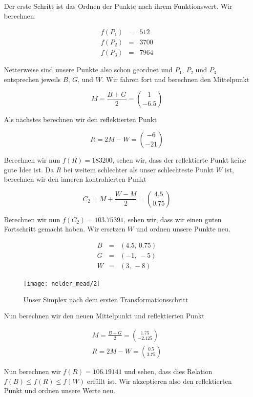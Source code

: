 \documentclass[naustrian]{article}
\begin{document}
{Der erste Schritt ist das Ordnen der Punkte nach ihrem Funktionswert. Wir berechnen:

\begin{eqnarray*}
    f(P_{1}) & = & 512\\
    f(P_{2}) & = & 3700\\
    f(P_{3}) & = & 7964
\end{eqnarray*}

Netterweise sind unsere Punkte also schon geordnet und $P_{1}$, $P_{2}$ und $P_{3}$ entsprechen jeweils
$B$, $G$, und $W$. Wir fahren fort und berechnen den Mittelpunkt

\[
    M = \frac{B + G}{2} = \binom{1}{-6.5}
\]

Als nächstes berechnen wir den reflektierten Punkt

\[
    R = 2M - W = \binom{-6}{-21}
\]

Berechnen wir nun $f(R) = 183200$, sehen wir, dass der reflektierte Punkt keine gute Idee ist. Da $R$
bei weitem schlechter als unser schlechteste Punkt $W$ ist, berechnen wir den inneren kontrahierten Punkt

\[
    C_{2} = M + \frac{W - M}{2} = \binom{4.5}{0.75}
\]

Berechnen wir nun $f(C_{2}) = 103.75391$, sehen wir, dass
wir einen guten Fortschritt gemacht haben. Wir ersetzen
$W$ und ordnen unsere Punkte neu.

\begin{eqnarray*}
    B & = & (4.5, \, 0.75)\\
    G & = & (-1,\,-5)\\
    W & = & (3,\,-8)
\end{eqnarray*}

\begin{figure}[H]
    \centering
    \texttt{[image: nelder\_mead/2]}
    \caption{Unser Simplex nach dem ersten Transformationsschritt}
\end{figure}

Nun berechnen wir den neuen Mittelpunkt und reflektierten Punkt

\begin{eqnarray*}
    M = \frac{B + G}{2} = \binom{1.75}{-2.125}\\
    R = 2M - W = \binom{0.5}{3.75}
\end{eqnarray*}

Nun berechnen wir $f(R) = 106.19141$ und sehen, dass dies Relation $f(B) \leq f(R) \leq f(W)$ erfüllt ist. Wir akzeptieren also
den reflektierten Punkt und ordnen unsere Werte neu.

}
\end{document}
